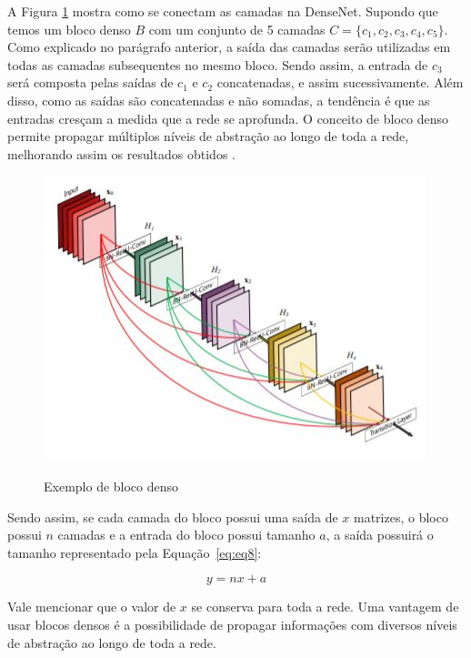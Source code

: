 A Figura \ref{fig:blocodenso} mostra como se conectam as camadas na \ac{DenseNet}. Supondo que temos um bloco denso $B$ com um conjunto de 5 camadas $C = \{c_1, c_2, c_3, c_4, c_5\}$. Como explicado no parágrafo anterior, a saída das camadas serão utilizadas em todas as camadas subsequentes no mesmo bloco. Sendo assim, a entrada de $c_3$ será composta pelas saídas de $c_1$ e $c_2$ concatenadas, e assim sucessivamente. Além disso, como as saídas são concatenadas e não somadas, a tendência é que as entradas cresçam a medida que a rede se aprofunda. O conceito de bloco denso permite propagar múltiplos níveis de abstração ao longo de toda a rede, melhorando assim os resultados obtidos \cite{liu-2017}.

\begin{figure}[H]
	\setlength{\abovecaptionskip}{0pt}
	\setlength{\belowcaptionskip}{0pt}
	\caption[Exemplo de bloco denso]{Exemplo de bloco denso}
	\centering
	\includegraphics[width=.5\textwidth]{imagem/0x_densenet_block.jpg}
	\captionsetup{justification=centering}
	\label{fig:blocodenso}
\end{figure} 

Sendo assim, se cada camada do bloco possui uma saída de $x$ matrizes, o bloco possui $n$ camadas e a entrada do bloco possui tamanho $a$, a saída possuirá o tamanho representado pela Equação~\ref{eq:eq8}:

\begin{equation}
	\label{eq:eq8}	y = n x + a
\end{equation}

Vale mencionar que o valor de $x$ se conserva para toda a rede. Uma vantagem de usar blocos densos é a possibilidade de propagar informações com diversos níveis de abstração ao longo de toda a rede.

